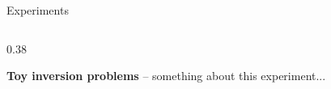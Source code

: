 \documentclass[final]{beamer}
\newlength{\onecolwid}
\newlength{\twocolwid}
\begin{document}
\begin{frame}[t]
\begin{columns}[t]
\begin{column}{\twocolwid}
\vspace{-1.5cm}


\begin{columns}[t,totalwidth=\twocolwid] %

\begin{column}{\twocolwid}


\begin{block}{Experiments}

\begin{columns}
\begin{column}{0.38\twocolwid}

\textbf{Toy inversion problems} -- something about this experiment...


\end{column}
\end{columns}
\end{block}
\end{column}
\end{columns}
\end{column}
\end{columns}
\end{frame}
\end{document}
